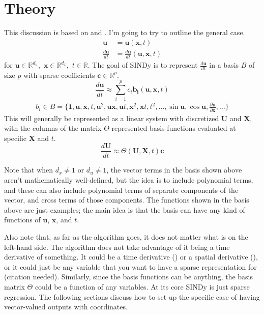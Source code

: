 \documentclass{article}
\let\vec\mathbf
\def\real{\mathbb{R}}
\begin{document}
\tableofcontents

\pagebreak
\section{Theory}

This discussion is based on \cite{brunton2016sindy} and \cite{shea2020sindy-bvp}.
I'm going to try to outline the general case. 
\begin{align}
\vec{u} &= \vec{u}(\vec{x}, t) \\
\frac{d\vec{u}}{dt} &= \frac{d\vec{u}}{dt}(\vec{u}, \vec{x}, t)
\end{align}
for $\vec{u} \in \real^{d_u}, \,\, \vec{x} \in \real^{d_x}, \,\, t \in \real$.
The goal of SINDy is to represent $\frac{d\vec{u}}{dt}$ in a basis $B$ of size
$p$ with sparse coefficients $\vec{c} \in \real^p$.
\begin{equation}\label{eq:dudt-approx}
\frac{d\vec{u}}{dt} \approx \sum_{i=1}^p c_i \vec{b_i}(\vec{u},\vec{x},t)
\end{equation}
\begin{align}
b_i \in B = \{\vec{1}, \vec{u}, \vec{x}, t, \vec{u}^2, \vec{u}\vec{x},\vec{u}t,\vec{x}^2,\vec{x}t,t^2,\hdots,\sin\vec{u},\cos{\vec{u}}, \frac{\partial\vec{u}}{\partial \vec{x}},\hdots\}
\end{align}
This will generally be represented as a linear system with discretized $\vec{U}$
and $\vec{X}$, with the columns of the matrix $\Theta$ represented basis
functions evaluated at specific $\vec{X}$ and $t$.
\begin{equation}\label{eq:basis-system}
\frac{d\vec{U}}{dt} \approx \Theta(\vec{U}, \vec{X}, t) \vec{c}
\end{equation}

Note that when $d_x \ne 1$ or $d_u \ne 1$, the vector terms in the basis shown above
aren't mathematically well-defined, but the idea is to include polynomial terms,
and these can also include polynomial terms of separate components of the
vector, and cross terms of those components. The functions shown in the basis
above are just examples; the main idea is that the basis can have any kind of
functions of $\vec{u}$, $\vec{x}$, and $t$.

Also note that, as far as the algorithm goes, it does not matter what is on the
left-hand side. The algorithm does not take advantage of it being a time
derivative of something. It could be a time derivative (\cite{brunton2016sindy})
or a spatial derivative (\cite{shea2020sindy-bvp}), or it could just be any
variable that you want to have a sparse representation for (citation needed).
Similarly, since the basis functions can be anything, the basis matrix $\Theta$
could be a function of any variables. At its core SINDy is just sparse
regression. The following sections discuss how to set up the specific case of
having vector-valued outputs with coordinates.
\end{document}

